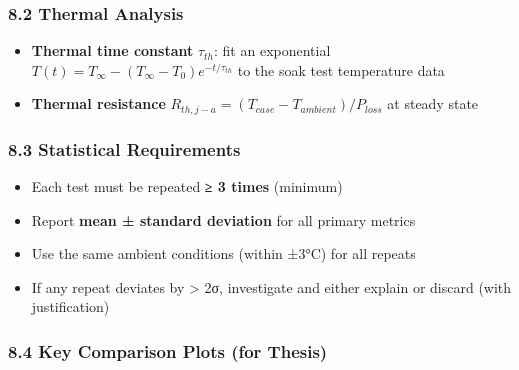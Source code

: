 \documentclass[
]{article}
\providecommand{\tightlist}{%
  \setlength{\itemsep}{0pt}\setlength{\parskip}{0pt}}
\begin{document}
\subsubsection{8.2 Thermal Analysis}\label{thermal-analysis}

\begin{itemize}
\tightlist
\item
  \textbf{Thermal time constant} \(\tau_{th}\): fit an exponential
  \(T(t) = T_\infty - (T_\infty - T_0) e^{-t/\tau_{th}}\) to the soak
  test temperature data
\item
  \textbf{Thermal resistance}
  \(R_{th,j-a} = (T_{case} - T_{ambient}) / P_{loss}\) at steady state
\end{itemize}

\subsubsection{8.3 Statistical
Requirements}\label{statistical-requirements}

\begin{itemize}
\tightlist
\item
  Each test must be repeated \textbf{≥ 3 times} (minimum)
\item
  Report \textbf{mean ± standard deviation} for all primary metrics
\item
  Use the same ambient conditions (within ±3°C) for all repeats
\item
  If any repeat deviates by \textgreater{} 2σ, investigate and either
  explain or discard (with justification)
\end{itemize}

\subsubsection{8.4 Key Comparison Plots (for
Thesis)}\label{key-comparison-plots-for-thesis}
\end{document}
